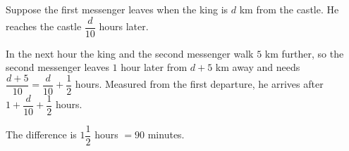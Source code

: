 Suppose the first messenger leaves when the king is $d$ km from the castle. He reaches the castle $\dfrac{d}{10}$ hours later.

In the next hour the king and the second messenger walk $5$ km further, so the second messenger leaves $1$ hour later from $d+5$ km away and needs $\dfrac{d+5}{10}=\dfrac {d}{10}+\dfrac{1}{2}$ hours. Measured from the first departure, he arrives after $1+\dfrac{d}{10}+\dfrac{1}{2}$ hours.

The difference is $1\dfrac{1}{2}$ hours $=\boxed{90}$ minutes.
